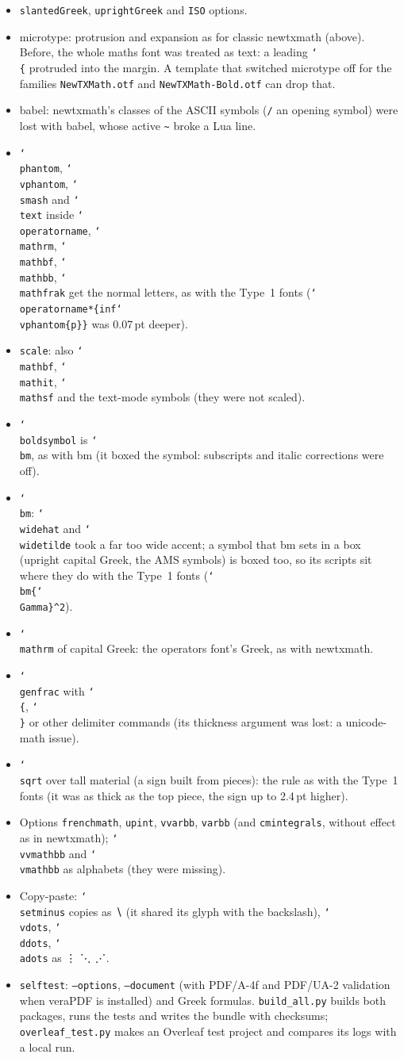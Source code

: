 \documentclass[11pt,a4paper]{article}
\newcommand\cs[1]{\texttt{\char`\\#1}}
\begin{document}
\begin{itemize}
\item \texttt{slantedGreek}, \texttt{uprightGreek} and \texttt{ISO} options.
\item \textsf{microtype}: protrusion and expansion as for classic \textsf{newtxmath} (above).
  Before, the whole maths font was treated as text: a leading \cs{\{} protruded into the
  margin. A template that switched \textsf{microtype} off for the families
  \texttt{NewTXMath.otf} and \texttt{NewTXMath-Bold.otf} can drop that.
\item \textsf{babel}: \textsf{newtxmath}'s classes of the ASCII symbols (\texttt{/} an opening
  symbol) were lost with \textsf{babel}, whose active \verb|~| broke a Lua line.
\item \cs{phantom}, \cs{vphantom}, \cs{smash} and \cs{text} inside \cs{operatorname},
  \cs{mathrm}, \cs{mathbf}, \cs{mathbb}, \cs{mathfrak} get the normal letters, as with the Type~1
  fonts (\cs{operatorname*\{inf\cs{vphantom}\{p\}\}} was 0.07\,pt deeper).
\item \texttt{scale}: also \cs{mathbf}, \cs{mathit}, \cs{mathsf} and the text-mode symbols
  (they were not scaled).
\item \cs{boldsymbol} is \cs{bm}, as with \textsf{bm} (it boxed the symbol: subscripts and
  italic corrections were off).
\item \cs{bm}: \cs{widehat} and \cs{widetilde} took a far too wide accent; a symbol that
  \textsf{bm} sets in a box (upright capital Greek, the AMS symbols) is boxed too, so its scripts
  sit where they do with the Type~1 fonts (\cs{bm\{\cs{Gamma}\}\^{}2}).
\item \cs{mathrm} of capital Greek: the operators font's Greek, as with \textsf{newtxmath}.
\item \cs{genfrac} with \cs{\{}, \cs{\}} or other delimiter commands (its thickness argument was
  lost: a \textsf{unicode-math} issue).
\item \cs{sqrt} over tall material (a sign built from pieces): the rule as with the Type~1
  fonts (it was as thick as the top piece, the sign up to 2.4\,pt higher).
\item Options \texttt{frenchmath}, \texttt{upint}, \texttt{vvarbb}, \texttt{varbb} (and
  \texttt{cmintegrals}, without effect as in \textsf{newtxmath}); \cs{vvmathbb} and
  \cs{vmathbb} as alphabets (they were missing).
\item Copy-paste: \cs{setminus} copies as ∖ (it shared its glyph with the backslash),
  \cs{vdots}, \cs{ddots}, \cs{adots} as ⋮ ⋱ ⋰.
\item \texttt{selftest}: \texttt{--options}, \texttt{--document} (with PDF/A-4f and PDF/UA-2
  validation when veraPDF is installed) and Greek formulas. \texttt{build\_all.py} builds
  both packages, runs the tests and writes the bundle with checksums;
  \texttt{overleaf\_test.py} makes an Overleaf test project and compares its logs with a
  local run.
\end{itemize}
\end{document}
